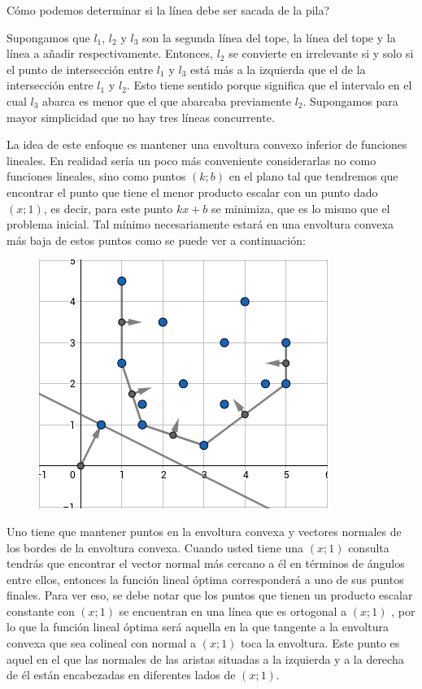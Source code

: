 Cómo podemos determinar si la línea debe ser sacada de la pila?

Supongamos que $l_1$, $l_2$ y $l_3$ son la segunda línea del tope, la línea del tope y la línea a añadir
respectivamente. Entonces, $l_2$ se convierte en irrelevante si y solo si el punto de intersección entre $l_1$ y $l_3$ está más a la izquierda que el de la intersección entre $l_1$ y $l_2$. Esto tiene sentido porque significa que el intervalo en el cual $l_3$ abarca es menor que el que abarcaba previamente $l_2$. Supongamos para mayor simplicidad que no hay tres líneas concurrente.

La idea de este enfoque es mantener una envoltura convexo inferior de funciones lineales. En realidad 
sería un poco más conveniente considerarlas no como funciones lineales, sino como puntos $(k;b)$ en el 
plano tal que tendremos que encontrar el punto que tiene el menor producto escalar con un punto dado $(x;1)$, es decir, para este punto $kx+b$ se minimiza, que es lo mismo que el problema inicial. Tal mínimo necesariamente estará en una envoltura convexa más baja de estos puntos como se puede ver a continuación:

\begin{figure}[h!]
	\centering
	\includegraphics[width=0.2\linewidth]{img/convex_hull_trick2}
	\label{fig:l}
\end{figure}

Uno tiene que mantener puntos en la envoltura convexa y vectores normales de los bordes de la envoltura convexa. Cuando usted tiene una $(x;1)$ consulta tendrás que encontrar el vector normal más cercano a él en términos de ángulos entre ellos, entonces la función lineal óptima corresponderá a uno de sus puntos finales. Para ver eso, se debe notar que los puntos que tienen un producto escalar constante con $(x;1)$ se encuentran en una línea que es ortogonal a $(x;1)$ , por lo que la función lineal óptima será aquella en la que tangente a la envoltura convexa que sea colineal con normal a $(x;1)$ toca la envoltura. Este punto es aquel en el que las normales de las aristas situadas a la izquierda y a la derecha de él están encabezadas en diferentes lados de $(x;1)$. 

